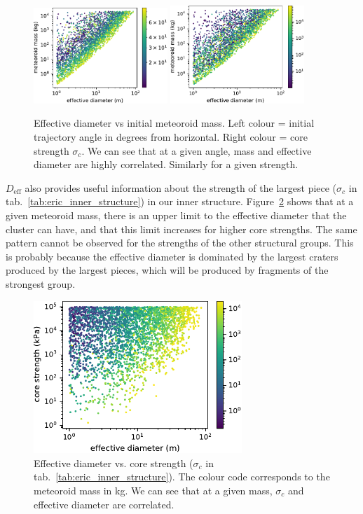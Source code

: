 \begin{figure}
    \centering
    \includegraphics[width=0.45\textwidth]{figures/d_eff_vs_mass}
    \includegraphics[width=0.45\textwidth]{figures/d_eff_vs_mass_strength}
    \caption{Effective diameter vs initial meteoroid mass. Left colour = initial trajectory angle in degrees from horizontal. Right colour = core strength $\sigma_c$. We can see that at a given angle, mass and effective diameter are highly correlated. Similarly for a given strength.}
    \label{fig:d_eff_vs_m}
\end{figure}

$D_\mathrm{eff}$ also provides useful information about the strength of the largest piece ($\sigma_c$ in tab.~\ref{tab:eric_inner_structure}) in our inner structure. Figure~\ref{fig:d_eff_vs_strength} shows that at a given meteoroid mass, there is an upper limit to the effective diameter that the cluster can have, and that this limit increases for higher core strengths.
The same pattern cannot be observed for the strengths of the other structural groups. This is probably because the effective diameter is dominated by the largest craters produced by the largest pieces, which will be produced by fragments of the strongest group.

\begin{figure}
    \centering
    \includegraphics[width=0.7\textwidth]{figures/d_eff_vs_strength}
    \caption{Effective diameter vs. core strength ($\sigma_c$ in tab.~\ref{tab:eric_inner_structure}). The colour code corresponds to the meteoroid mass in kg. We can see that at a given mass, $\sigma_c$ and effective diameter are correlated.}
    \label{fig:d_eff_vs_strength}
\end{figure}

